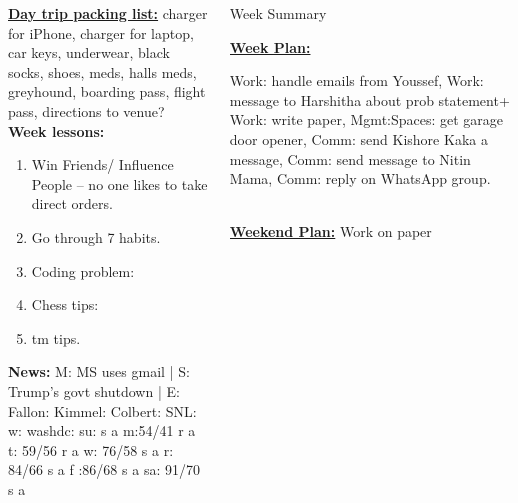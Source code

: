 \begin{columns}
\begin{column}{0.25\linewidth}
      \begin{block}
      
      {\underline{\bf Day trip packing list:} charger for iPhone,
        charger for laptop, car keys, underwear, black socks, shoes,
        meds, halls meds, greyhound, boarding pass, flight pass, directions to
        venue?} \\ 
      {\tiny {\bf Week lessons:}} \\ 
      \begin{enumerate}
        \tiny \item \tiny Win Friends/ Influence People – no one
        likes to take direct orders.
      \item \tiny Go through 7 habits.
      \item \tiny Coding problem: 
      \item \tiny Chess tips: 
      \item \tiny tm tips.
      \end{enumerate}
          {{\tiny {\bf News:}} M: MS uses gmail | S:  Trump's govt shutdown | E:
            Fallon:   Kimmel:  Colbert: SNL:
            w: washdc: 
            {su: { s a}}
            {m:{54/41 r a}}
            {t: {59/56 r a}} 
            {w: {76/58 s a}} 
            {r: {84/66 s a}}
            {f :{86/68 s a} }
            {sa: {91/70 s a}}}
    \end{block} 

  \end{column}
  \begin{column}{0.5\linewidth}
    \begin{block}{Week Summary} 
      {\underline {\bf Week Plan:} 

        Work: handle emails from Youssef,
        Work: message to Harshitha about prob statement+ Work: write
        paper, Mgmt:Spaces: get garage door opener, Comm: send Kishore
      Kaka a message, Comm: send message to Nitin Mama, Comm: reply on
      WhatsApp group.

} \\ 
      {\underline{\bf Weekend Plan:} Work on paper }\\
    \end{block}


\end{column}
\end{columns}
